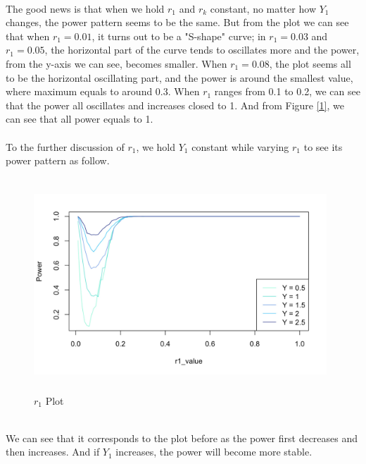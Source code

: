 \documentclass[10pt,english]{article}\usepackage{graphicx, color}
\numberwithin{equation}{section}
\numberwithin{figure}{section}
\begin{document}
\quad\\
The good news is that when we hold $r_1$ and $r_k$ constant, no matter how $Y_1$ changes, the power pattern seems to be the same. But from the plot we can see that when $r_1=0.01$, it turns out to be a "S-shape" curve; in $r_1=0.03$ and $r_1=0.05$, the horizontal part of the curve tends to oscillates more and the power, from the y-axis we can see, becomes smaller. When $r_1=0.08$, the plot seems all to be the horizontal oscillating part, and the power is around the smallest value, where maximum equals to around 0.3. When $r_1$ ranges from 0.1 to 0.2, we can see that the power all oscillates and increases closed to 1. And from Figure \ref{1}, we can see that all power equals to 1.\\
\quad\\
To the further discussion of $r_1$, we hold $Y_1$ constant while varying $r_1$ to see its power pattern as follow.\\
\begin{figure}[htbp]
\centering\includegraphics[width=11cm,height=8cm]{r1}
\caption{$r_1$ Plot}
\end{figure}
\quad\\
We can see that it corresponds to the plot before as the power first decreases and then increases. And if $Y_1$ increases, the power will become more stable.\\
\end{document}
